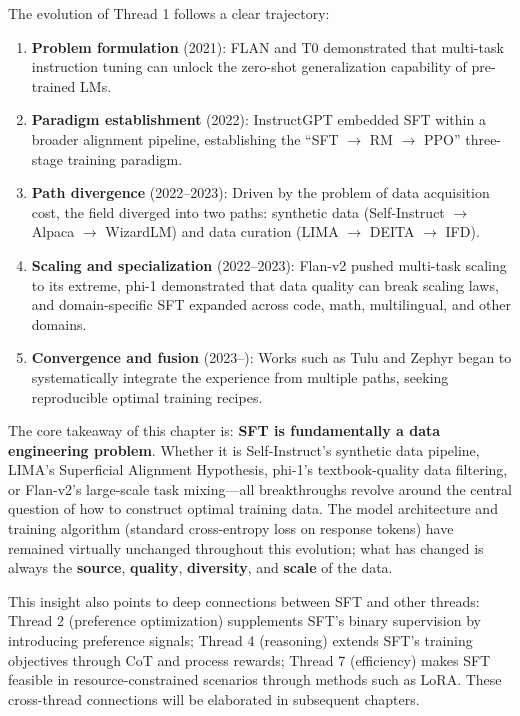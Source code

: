The evolution of Thread 1 follows a clear trajectory:
\begin{enumerate}[leftmargin=1.5em]
  \item \textbf{Problem formulation} (2021): FLAN and T0 demonstrated that multi-task instruction tuning
    can unlock the zero-shot generalization capability of pre-trained LMs.
  \item \textbf{Paradigm establishment} (2022): InstructGPT embedded SFT within a broader alignment pipeline,
    establishing the ``SFT $\rightarrow$ RM $\rightarrow$ PPO'' three-stage training paradigm.
  \item \textbf{Path divergence} (2022--2023): Driven by the problem of data acquisition cost,
    the field diverged into two paths: synthetic data (Self-Instruct $\rightarrow$ Alpaca $\rightarrow$ WizardLM)
    and data curation (LIMA $\rightarrow$ DEITA $\rightarrow$ IFD).
  \item \textbf{Scaling and specialization} (2022--2023): Flan-v2 pushed multi-task scaling to its extreme,
    phi-1 demonstrated that data quality can break scaling laws,
    and domain-specific SFT expanded across code, math, multilingual, and other domains.
  \item \textbf{Convergence and fusion} (2023--): Works such as Tulu and Zephyr began to systematically integrate
    the experience from multiple paths, seeking reproducible optimal training recipes.
\end{enumerate}

\noindent
The core takeaway of this chapter is:
\textbf{SFT is fundamentally a data engineering problem}.
Whether it is Self-Instruct's synthetic data pipeline,
LIMA's Superficial Alignment Hypothesis,
phi-1's textbook-quality data filtering,
or Flan-v2's large-scale task mixing---all
breakthroughs revolve around the central question of how to construct optimal training data.
The model architecture and training algorithm (standard cross-entropy loss on response tokens)
have remained virtually unchanged throughout this evolution;
what has changed is always the \textbf{source}, \textbf{quality}, \textbf{diversity}, and \textbf{scale} of the data.

This insight also points to deep connections between SFT and other threads:
Thread 2 (preference optimization) supplements SFT's binary supervision by introducing preference signals;
Thread 4 (reasoning) extends SFT's training objectives through CoT and process rewards;
Thread 7 (efficiency) makes SFT feasible in resource-constrained scenarios through methods such as LoRA.
These cross-thread connections will be elaborated in subsequent chapters.

